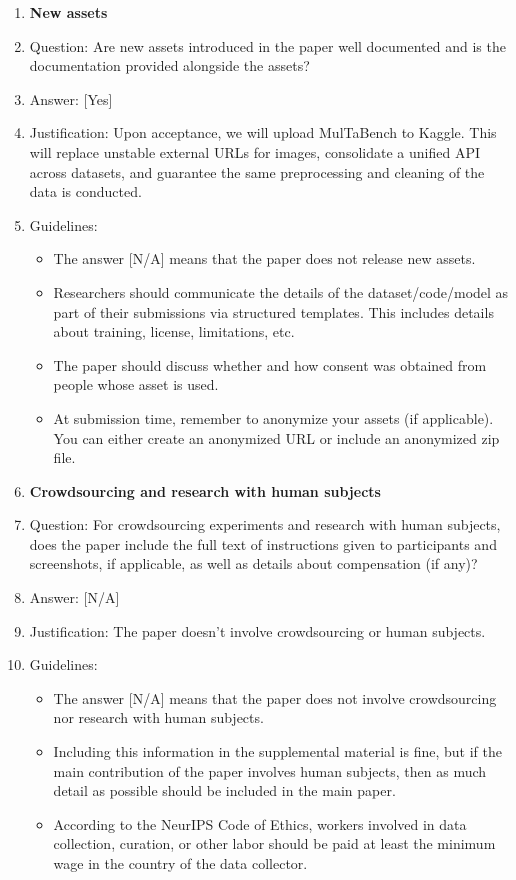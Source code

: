 \documentclass{llmxive}
\providecommand{\answerYes}[1][]{[Yes]#1}
\providecommand{\answerNA}[1][]{[N/A]#1}
\begin{document}
\begin{enumerate}
\item {\bf New assets}
    \item[] Question: Are new assets introduced in the paper well documented and is the documentation provided alongside the assets?
    \item[] Answer: \answerYes{}
    \item[] Justification: Upon acceptance, we will upload MulTaBench to Kaggle. This will replace unstable external URLs for images, consolidate a unified API across datasets, and guarantee the same preprocessing and cleaning of the data is conducted.
    \item[] Guidelines:
    \begin{itemize}
        \item The answer \answerNA{} means that the paper does not release new assets.
        \item Researchers should communicate the details of the dataset\slash code\slash model as part of their submissions via structured templates. This includes details about training, license, limitations, etc. 
        \item The paper should discuss whether and how consent was obtained from people whose asset is used.
        \item At submission time, remember to anonymize your assets (if applicable). You can either create an anonymized URL or include an anonymized zip file.
    \end{itemize}

\item {\bf Crowdsourcing and research with human subjects}
    \item[] Question: For crowdsourcing experiments and research with human subjects, does the paper include the full text of instructions given to participants and screenshots, if applicable, as well as details about compensation (if any)? 
    \item[] Answer: \answerNA{}
    \item[] Justification: The paper doesn’t involve crowdsourcing or human subjects.
    \item[] Guidelines:
    \begin{itemize}
        \item The answer \answerNA{} means that the paper does not involve crowdsourcing nor research with human subjects.
        \item Including this information in the supplemental material is fine, but if the main contribution of the paper involves human subjects, then as much detail as possible should be included in the main paper. 
        \item According to the NeurIPS Code of Ethics, workers involved in data collection, curation, or other labor should be paid at least the minimum wage in the country of the data collector. 
    \end{itemize}


\end{enumerate}
\end{document}
